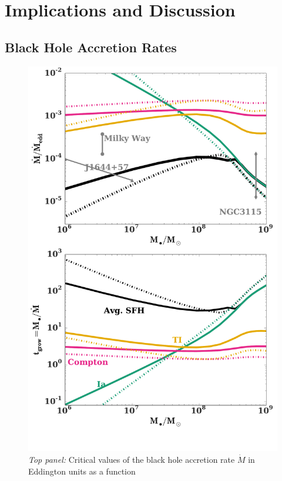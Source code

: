 \documentclass[usenatbib,fleqn]{mn2e}
\begin{document}
\section{Implications and Discussion}
\label{sec:discussion}

\subsection{Black Hole Accretion Rates}
\label{sec:mdot}



\begin{figure}
\includegraphics[width=\columnwidth]{mdot_sfr.pdf}
\caption{\label{fig:bh_growth} {\it Top panel:} Critical values of the
  black hole accretion rate $\dot{M}$ in Eddington units as a function
}
\end{figure}
\end{document}
